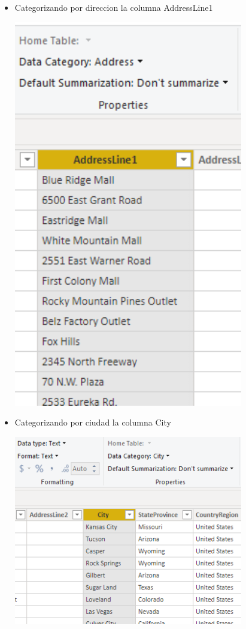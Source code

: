 \begin{itemize}
	\item Categorizando por direccion la columna AddressLine1
	\begin{center}
	\includegraphics[width=10cm]{./Imagenes/Captura2-5} 
	\end{center}
\end{itemize} 
\begin{itemize}
	\item Categorizando por ciudad la columna City
	\begin{center}
	\includegraphics[width=10cm]{./Imagenes/Captura2-6} 
	\end{center}
\end{itemize} 

